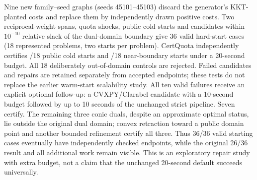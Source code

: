 Nine new family--seed graphs (seeds 45101--45103) discard the generator's
KKT-planted costs and replace them by independently drawn positive costs.
Two reciprocal-weight spans, quota shocks, public cold starts and candidates
within $10^{-10}$ relative slack of the dual-domain boundary give 36 valid
hard-start cases (18 represented problems, two starts per problem). CertQuota
independently certifies \AFiveColdAccepted/18 public cold starts and
\AFiveBoundaryAccepted/18 near-boundary starts under a 20-second budget.
All 18 deliberately out-of-domain controls are rejected. Failed candidates
and repairs are retained separately from accepted endpoints; these tests do
not replace the earlier warm-start scalability study.
All ten valid failures receive an explicit optional follow-up: a
CVXPY/Clarabel candidate with a 10-second budget followed by up to 10 seconds
of the unchanged strict pipeline. Seven certify. The remaining three conic
duals, despite an approximate optimal status, lie outside the original dual
domain; convex retraction toward a public domain point and another bounded
refinement certify all three. Thus 36/36 valid starting cases eventually have
independently checked endpoints, while the original 26/36 result and all
additional work remain visible. This is an exploratory repair study with extra
budget, not a claim that the unchanged 20-second default succeeds universally.

